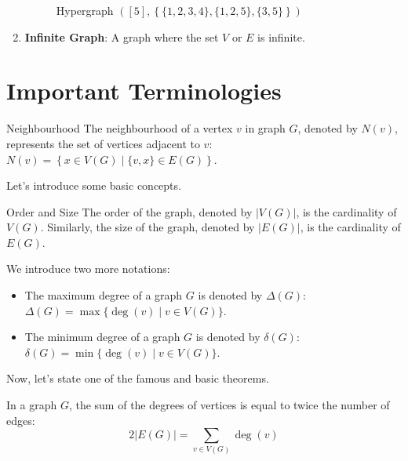 \documentclass[../basic_graph_theory.tex]{subfiles}
\begin{document}
\begin{enumerate}
\begin{figure}[hbt!]
          \caption{Hypergraph $ \left( [5], \left\{ \{ 1, 2, 3, 4 \}, \{ 1, 2, 5 \}, \{ 3, 5 \} \right\} \right) $}
          \label{fig:hypergraph}
        \end{figure}
  \item \textbf{Infinite Graph}: A graph where the set $V$ or $E$ is infinite.
\end{enumerate}

\section{Important Terminologies}
\begin{Def}{Neighbourhood}{}
  The neighbourhood of a vertex $v$ in graph $G$, denoted by $N(v)$, represents the set of vertices adjacent to $v$: $N(v) = \left\{x \in V(G) \mid \{v,x\} \in E(G)\right\}$.
\end{Def}

Let's introduce some basic concepts.

\begin{Def}{Order and Size}{}
  The order of the graph, denoted by $|V(G)|$, is the cardinality of $V(G)$. Similarly, the size of the graph, denoted by $|E(G)|$, is the cardinality of $E(G)$.
\end{Def}

We introduce two more notations:

\begin{itemize}
  \item The maximum degree of a graph $G$ is denoted by $\Delta(G)$: $\Delta(G) = \max\{\deg(v) \mid v \in V(G)\}$.
  \item The minimum degree of a graph $G$ is denoted by $\delta(G)$: $\delta(G) = \min\{\deg(v) \mid v \in V(G)\}$.
\end{itemize}

Now, let's state one of the famous and basic theorems.

\begin{Thm}{}{}
  \label{ref:3}
  In a graph $G$, the sum of the degrees of vertices is equal to twice the number of edges:
  \[ 2 |E(G)| = \sum_{v \in V(G)}\deg(v) \]
\end{Thm}
\end{document}
